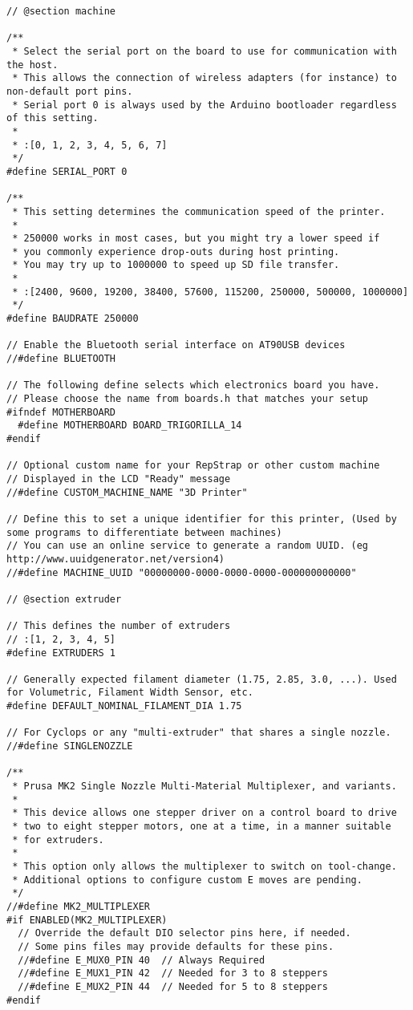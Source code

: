 \begin{lstlisting}[caption = キャプション, label = ラベル]
// @section machine

/**
 * Select the serial port on the board to use for communication with the host.
 * This allows the connection of wireless adapters (for instance) to non-default port pins.
 * Serial port 0 is always used by the Arduino bootloader regardless of this setting.
 *
 * :[0, 1, 2, 3, 4, 5, 6, 7]
 */
#define SERIAL_PORT 0

/**
 * This setting determines the communication speed of the printer.
 *
 * 250000 works in most cases, but you might try a lower speed if
 * you commonly experience drop-outs during host printing.
 * You may try up to 1000000 to speed up SD file transfer.
 *
 * :[2400, 9600, 19200, 38400, 57600, 115200, 250000, 500000, 1000000]
 */
#define BAUDRATE 250000

// Enable the Bluetooth serial interface on AT90USB devices
//#define BLUETOOTH

// The following define selects which electronics board you have.
// Please choose the name from boards.h that matches your setup
#ifndef MOTHERBOARD
  #define MOTHERBOARD BOARD_TRIGORILLA_14
#endif

// Optional custom name for your RepStrap or other custom machine
// Displayed in the LCD "Ready" message
//#define CUSTOM_MACHINE_NAME "3D Printer"

// Define this to set a unique identifier for this printer, (Used by some programs to differentiate between machines)
// You can use an online service to generate a random UUID. (eg http://www.uuidgenerator.net/version4)
//#define MACHINE_UUID "00000000-0000-0000-0000-000000000000"

// @section extruder

// This defines the number of extruders
// :[1, 2, 3, 4, 5]
#define EXTRUDERS 1

// Generally expected filament diameter (1.75, 2.85, 3.0, ...). Used for Volumetric, Filament Width Sensor, etc.
#define DEFAULT_NOMINAL_FILAMENT_DIA 1.75

// For Cyclops or any "multi-extruder" that shares a single nozzle.
//#define SINGLENOZZLE

/**
 * Prusa MK2 Single Nozzle Multi-Material Multiplexer, and variants.
 *
 * This device allows one stepper driver on a control board to drive
 * two to eight stepper motors, one at a time, in a manner suitable
 * for extruders.
 *
 * This option only allows the multiplexer to switch on tool-change.
 * Additional options to configure custom E moves are pending.
 */
//#define MK2_MULTIPLEXER
#if ENABLED(MK2_MULTIPLEXER)
  // Override the default DIO selector pins here, if needed.
  // Some pins files may provide defaults for these pins.
  //#define E_MUX0_PIN 40  // Always Required
  //#define E_MUX1_PIN 42  // Needed for 3 to 8 steppers
  //#define E_MUX2_PIN 44  // Needed for 5 to 8 steppers
#endif


\end{lstlisting}
